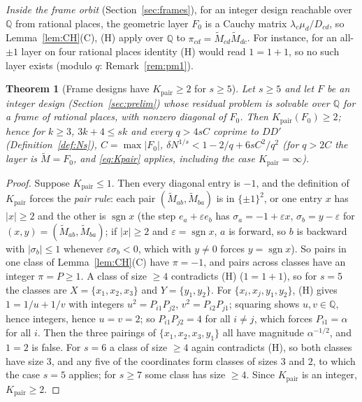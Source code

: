 \documentclass[11pt]{amsart}
\newtheorem{theorem}{Theorem}
\theoremstyle{definition}
\theoremstyle{plain}
\begin{document}
\emph{Inside the frame orbit} (Section~\ref{sec:frames}), for an integer design reachable over $\mathbb Q$ from rational places, the geometric layer $F_0$ is a Cauchy matrix $\lambda_c\mu_d/D_{cd}$, so Lemma~\ref{lem:CH}(C), (H) apply over $\mathbb{Q}$ to $\pi_{cd}=\tilde M_{cd}\tilde M_{dc}$. For instance, for an all-$\pm1$ layer on four rational places identity (H) would read $1=1+1$, so no such layer exists (modulo $q$: Remark~\ref{rem:pm1}).

\begin{theorem}[Frame designs have $K_{\mathrm{pair}}\ge2$ for $s\ge5$]\label{thm:O5}
Let $s\ge5$ and let $F$ be an integer design (Section~\ref{sec:prelim}) whose residual problem is solvable over $\mathbb{Q}$ for a frame of rational places, with nonzero diagonal of $F_0$. Then $K_{\mathrm{pair}}(F_0)\ge2$; hence for $k\ge3$, $3k+4\le sk$ and every $q>4sC$ coprime to $DD'$ (Definition~\ref{def:Ns}), $C=\max|F_0|$, $\delta N^{1/s}<1-2/q+6sC^2/q^2$ (for $q>2C$ the layer is $\tilde M=F_0$, and \eqref{eq:Kpair} applies, including the case $K_{\mathrm{pair}}=\infty$).
\end{theorem}

\begin{proof}
Suppose $K_{\mathrm{pair}}\le1$. Then every diagonal entry is $-1$, and the definition of $K_{\mathrm{pair}}$ forces the \emph{pair rule}: each pair $(\tilde M_{ab},\tilde M_{ba})$ is in $\{\pm1\}^2$, or one entry $x$ has $|x|\ge2$ and the other is $\operatorname{sgn}x$ (the step $e_a+\varepsilon e_b$ has $\sigma_a=-1+\varepsilon x$, $\sigma_b=y-\varepsilon$ for $(x,y)=(\tilde M_{ab},\tilde M_{ba})$; if $|x|\ge2$ and $\varepsilon=\operatorname{sgn}x$, $a$ is forward, so $b$ is backward with $|\sigma_b|\le1$ whenever $\varepsilon\sigma_b<0$, which with $y\ne0$ forces $y=\operatorname{sgn}x$). So pairs in one class of Lemma~\ref{lem:CH}(C) have $\pi=-1$, and pairs across classes have an integer $\pi=P\ge1$. A class of size $\ge4$ contradicts (H) ($1=1+1$), so for $s=5$ the classes are $X=\{x_1,x_2,x_3\}$ and $Y=\{y_1,y_2\}$. For $\{x_i,x_j,y_1,y_2\}$, (H) gives $1=1/u+1/v$ with integers $u^2=P_{i1}P_{j2}$, $v^2=P_{i2}P_{j1}$; squaring shows $u,v\in\mathbb{Q}$, hence integers, hence $u=v=2$; so $P_{i1}P_{j2}=4$ for all $i\ne j$, which forces $P_{i1}=\alpha$ for all $i$. Then the three pairings of $\{x_1,x_2,x_3,y_1\}$ all have magnitude $\alpha^{-1/2}$, and $1=2$ is false. For $s=6$ a class of size $\ge4$ again contradicts (H), so both classes have size $3$, and any five of the coordinates form classes of sizes $3$ and $2$, to which the case $s=5$ applies; for $s\ge7$ some class has size $\ge4$. Since $K_{\mathrm{pair}}$ is an integer, $K_{\mathrm{pair}}\ge2$.
\end{proof}
\end{document}
